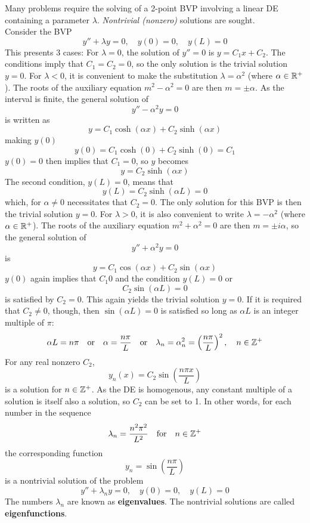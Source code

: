 \documentclass[./Differential Equations.tex]{subfiles}
\begin{document}
			Many problems require the solving of a 2-point BVP involving a linear DE containing a parameter \(\lambda\). \textit{Nontrivial (nonzero)} solutions are sought. \\
			Consider the BVP
				\[
					y'' + \lambda y = 0, \quad
					y(0) = 0, \quad
					y(L) = 0
				\]
			This presents 3 cases:
				For \(\lambda = 0\), the solution of \(y'' = 0\) is \(y = C_1x + C_2\). The conditions imply that \(C_1 = C_2 = 0\), so the only solution is the trivial solution \(y = 0\).
				For \(\lambda < 0\), it is convenient to make the substitution \(\lambda = \alpha^2\) (where \(\alpha \in \mathbb{R}^+\)). The roots of the auxiliary equation \(m^2 - \alpha^2 = 0\) are then \(m = \pm \alpha\). As the interval is finite, the general solution of
					\[y'' - \alpha^2y = 0\]
					is written as
					\[y = C_1\cosh(\alpha x) + C_2\sinh(\alpha x)\]
					making \(y(0)\)
					\[y(0) = C_1\cosh(0) + C_2\sinh(0) = C_1\]
					\(y(0) = 0\) then implies that \(C_1 = 0\), so \(y\) becomes
					\[y = C_2\sinh(\alpha x)\]
					The second condition, \(y(L) = 0\), means that
					\[y(L) = C_2\sinh(\alpha L) = 0\]
					which, for \(\alpha \ne 0\) necessitates that \(C_2 = 0\). The only solution for this BVP is then the trivial solution \(y =0\).
				For \(\lambda > 0\), it is also convenient to write \(\lambda = -\alpha^2\) (where \(\alpha \in \mathbb{R}^+\)). The roots of the auxiliary equation \(m^2 + \alpha^2 = 0\) are then \(m = \pm i\alpha\), so the general solution of
					\[y'' + \alpha^2y = 0\]
					is
					\[y = C_1\cos(\alpha x) + C_2\sin(\alpha x)\]
					\(y(0)\) again implies that \(C_1  0\) and the condition \(y(L) = 0\) or
					\[C_2\sin(\alpha L) = 0\]
					is satisfied by \(C_2 = 0\). This again yields the trivial solution \(y = 0\). If it is required that \(C_2 \ne 0\), though, then \(\sin(\alpha L) = 0\) is satisfied so long as \(\alpha L\) is an integer multiple of \(\pi\):
					\[
						\alpha L = n\pi \quad \text{or} \quad
						\alpha = \frac{n\pi}{L} \quad \text{or} \quad
						\lambda_n = \alpha_n^2 = \left(\frac{n\pi}{L}\right)^2, \quad
						n \in \mathbb{Z}^+
					\]
					For any real nonzero \(C_2\),
					\[y_n(x) = C_2\sin\left(\frac{n\pi x}{L}\right)\]
					is a solution for \(n \in \mathbb{Z}^+\). As the DE is homogenous, any constant multiple of a solution is itself also a solution, so \(C_2\) can be set to 1. In other words, for each number in the sequence
					\[\lambda_n = \frac{n^2\pi^2}{L^2} \quad \text{for} \quad n \in \mathbb{Z}^+\]
					the corresponding function
					\[y_n = \sin\left(\frac{n\pi}{L}\right)\]
					is a nontrivial solution of the problem
					\[
						y'' + \lambda_ny = 0, \quad
						y(0) = 0, \quad
						y(L) = 0
					\]
					The numbers \(\lambda_n\) are known as \textbf{eigenvalues}. The nontrivial solutions are called \textbf{eigenfunctions}.
\end{document}
